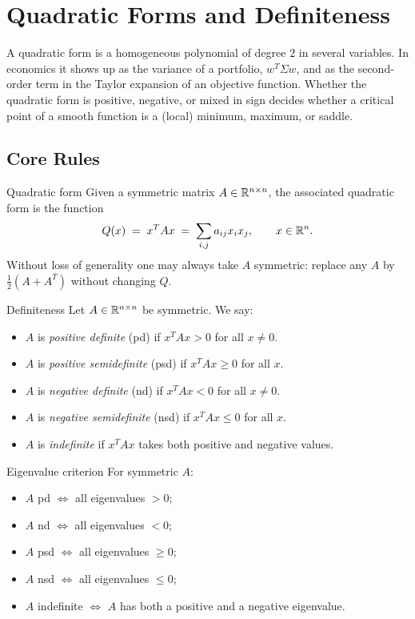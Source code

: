 \chapter{Quadratic Forms and Definiteness}

A quadratic form is a homogeneous polynomial of degree $2$ in several
variables. In economics it shows up as the variance of a portfolio,
$w^{T} \Sigma w$, and as the second-order term in the Taylor expansion of an
objective function. Whether the quadratic form is positive, negative, or
mixed in sign decides whether a critical point of a smooth function is a
(local) minimum, maximum, or saddle.

\section{Core Rules}

\begin{rulebox}{Quadratic form}
Given a symmetric matrix $A \in \mathbb{R}^{n \times n}$, the associated quadratic
form is the function
\[
Q(x) \;=\; x^{T} A x \;=\; \sum_{i, j} a_{ij} x_{i} x_{j}, \qquad x \in \mathbb{R}^{n}.
\]
Without loss of generality one may always take $A$ symmetric: replace any
$A$ by $\tfrac{1}{2}(A + A^{T})$ without changing $Q$.
\end{rulebox}

\begin{rulebox}{Definiteness}
Let $A \in \mathbb{R}^{n \times n}$ be symmetric. We say:
\begin{itemize}[leftmargin=1.6em,itemsep=0.3ex]
    \item $A$ is \emph{positive definite} (pd) if $x^{T} A x > 0$ for all $x \neq 0$.
    \item $A$ is \emph{positive semidefinite} (psd) if $x^{T} A x \ge 0$ for all $x$.
    \item $A$ is \emph{negative definite} (nd) if $x^{T} A x < 0$ for all $x \neq 0$.
    \item $A$ is \emph{negative semidefinite} (nsd) if $x^{T} A x \le 0$ for all $x$.
    \item $A$ is \emph{indefinite} if $x^{T} A x$ takes both positive and negative values.
\end{itemize}
\end{rulebox}

\begin{rulebox}{Eigenvalue criterion}
For symmetric $A$:
\begin{itemize}[leftmargin=1.6em,itemsep=0.3ex]
    \item $A$ pd $\Leftrightarrow$ all eigenvalues $> 0$;
    \item $A$ nd $\Leftrightarrow$ all eigenvalues $< 0$;
    \item $A$ psd $\Leftrightarrow$ all eigenvalues $\ge 0$;
    \item $A$ nsd $\Leftrightarrow$ all eigenvalues $\le 0$;
    \item $A$ indefinite $\Leftrightarrow$ $A$ has both a positive and a negative eigenvalue.
\end{itemize}
\end{rulebox}

